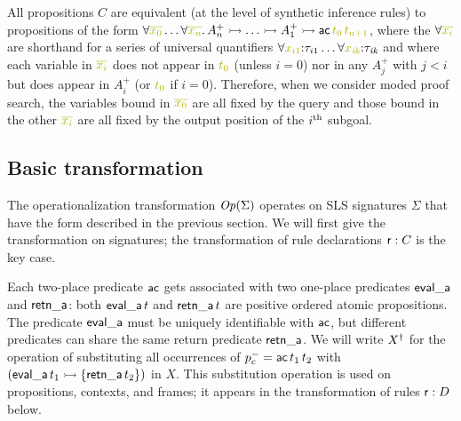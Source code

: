 All propositions $C$ are equivalent (at the level of synthetic
inference rules) to propositions of the form $\forall
\lf{\overline{x_0}}\ldots \forall \lf{\overline{x_n}}.\,A^+_n \lefti \ldots
\lefti A^+_1 \lefti {\sf ac}\,\lf{t_{0}}\,\lf{t_{n+1}}$, where the $\forall
\lf{\overline{x_i}}$ are shorthand for a series of universal quantifiers
$\forall \lf{x_{i1}}{:}{\tau_{i1}} \ldots \forall \lf{x_{\it
    ik}}{:}{\tau_{\it ik}}$ and where each variable in
$\lf{\overline{x_i}}$ does not appear in $\lf{t_0}$ (unless $i = 0$) nor in any
$A^+_j$ with $j < i$ but does appear in $A^+_i$ (or $\lf{t_0}$ if $i =
0$). Therefore, when we consider moded proof search, the variables
bound in $\lf{\overline{x_0}}$ are all fixed by the query and those bound
in the other $\lf{\overline{x_i}}$ are all fixed by the output position of
the $i^{\rm th}$ subgoal.

\subsection{Basic transformation}
\label{sec:trans-basic}

The operationalization transformation ${\it Op}({\Sigma})$
operates on SLS signatures $\Sigma$ that have the form described in the
previous section. We
will first give the transformation on signatures; the transformation
of rule declarations ${\sf r} : C$ is the key case.

Each two-place predicate ${\sf ac}$ gets associated with two
one-place
predicates ${\sf eval\_a}$ and ${\sf retn\_a}$: both ${\sf
  eval\_a}\,t$ and ${\sf retn\_a}\,t$ are positive ordered atomic
propositions. The predicate ${\sf eval\_a}$ must be uniquely
identifiable with ${\sf ac}$,
but different predicates can share the same return predicate ${\sf retn\_a}$.
We will write ${{X}^\dag}$ for the operation of
substituting all occurrences of $p^-_c = {\sf ac}\,t_1\,t_2$ with
$({\sf eval\_a}\,t_1 \rightarrowtail \{ {\sf retn\_a}\,t_2 \})$ in $X$. This
substitution operation is used on propositions, contexts, and frames;
it appears in the transformation of rules ${\sf r} : D$ below.

